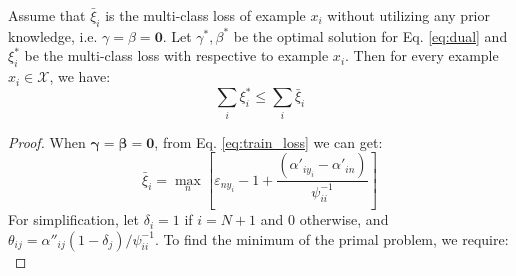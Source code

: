 
Assume that $\bar \xi_i$ is the multi-class loss of example $x_i$ without utilizing any prior knowledge, i.e. $\gamma=\beta = \mathbf{0}$. Let $\gamma^*, \beta^*$ be the optimal solution for Eq. \eqref{eq:dual} and $\xi_i^*$ be the multi-class loss with respective to example $x_i$. Then for every example $x_i \in \mathcal{X}$, we have:\[\sum\limits_i {{\xi^* _i}}  \le \sum\limits_i {{{\bar \xi }_i}} \]

\begin{proof}
When $\mathbf{\gamma}=\mathbf{\beta} = \mathbf{0}$, from Eq. \eqref{eq:train_loss} we can get:
\begin{equation*}
{\bar \xi _i} = \mathop {\max }\limits_n \left[ { {\varepsilon _{n{y_i}}}-1 + \frac{{\left( {{{\alpha '}_{i{y_i}}} - {{\alpha '}_{in}}} \right)}}{{\psi _{ii}^{ - 1}}}} \right]
\end{equation*}
For simplification, let $\delta_i=1$ if $i=N+1$ and 0 otherwise, and  ${\theta _{ij}} = {\alpha ''_{ij}}\left( {1 - {\delta _j}} \right)/\psi_{ii}^{ - 1}$.
To find the minimum of the primal problem, we require:
\begin{equation}

\end{equation}
\end{proof}
